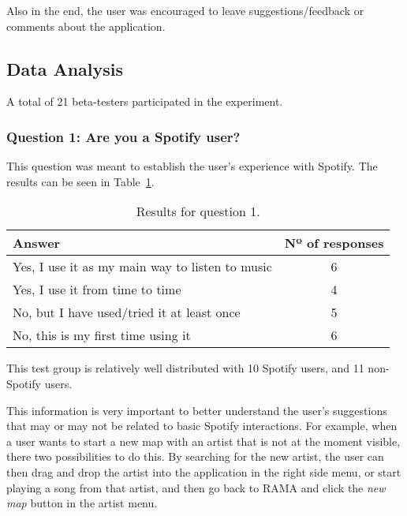     Also in the end, the user was encouraged to leave suggestions/feedback or comments about the application.



  \subsection{Data Analysis} %
  \label{sub:data_analysis}

    A total of 21 beta-testers participated in the experiment.

    \subsubsection{Question 1: Are you a Spotify user?} %
    \label{ssub:question_1}

      This question was meant to establish the user's experience with Spotify.
      The results can be seen in Table~\ref{tab:question1}.

      \begin{table}[H] %
         \begin{center}
           \begin{tabular}{l|c}
       
           \hline
           \textbf{Answer} & \textbf{Nº of responses} \\
           \hline

           \hline
              Yes, I use it as my main way to listen to music & 6 \\
              Yes, I use it from time to time & 4 \\
              No, but I have used/tried it at least once & 5 \\
              No, this is my first time using it & 6 \\
           \hline
           \end{tabular}
         \end{center}
         \caption{Results for question 1.}
         \label{tab:question1}
       \end{table}

      This test group is relatively well distributed with 10 Spotify users, and 11 non-Spotify users.

      This information is very important to better understand the user's suggestions that may or may not be related to basic Spotify interactions.
      For example, when a user wants to start a new map with an artist that is not at the moment visible, there two possibilities to do this.
      By searching for the new artist, the user can then drag and drop the artist into the application in the right side menu, or start playing a song from that artist, and then go back to RAMA and click the \emph{new map} button in the artist menu.

